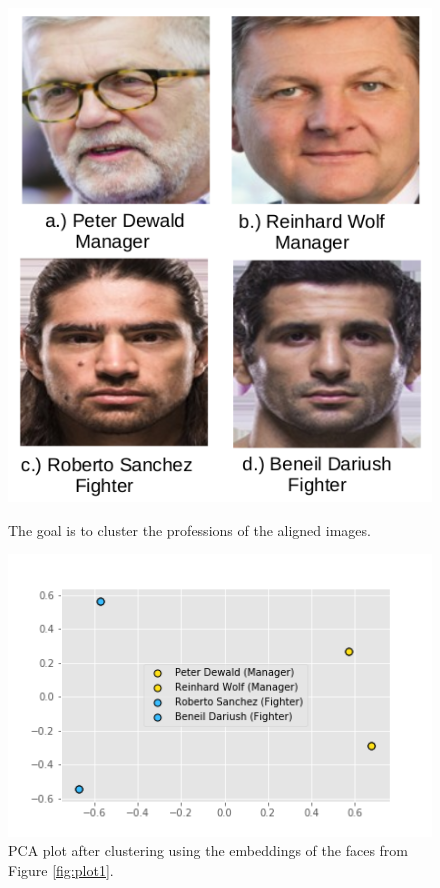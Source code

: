 \documentclass[12pt,english]{article}
\begin{document}
\begin{figure}[h!]
  \centering
  \begin{minipage}[b]{0.35\textwidth}
    \includegraphics[width=\textwidth]{figures/plot2.png}
    \caption{The goal is to cluster the professions of the aligned images.}
    \label{fig:plot1}
  \end{minipage}
  \hfill
  \begin{minipage}[b]{0.55\textwidth}
    \includegraphics[width=\textwidth]{figures/plot.png}
    \caption{PCA plot after clustering using the embeddings of the faces from Figure \ref{fig:plot1}.}
    \label{fig:plot2}
  \end{minipage}
\end{figure}
\end{document}
